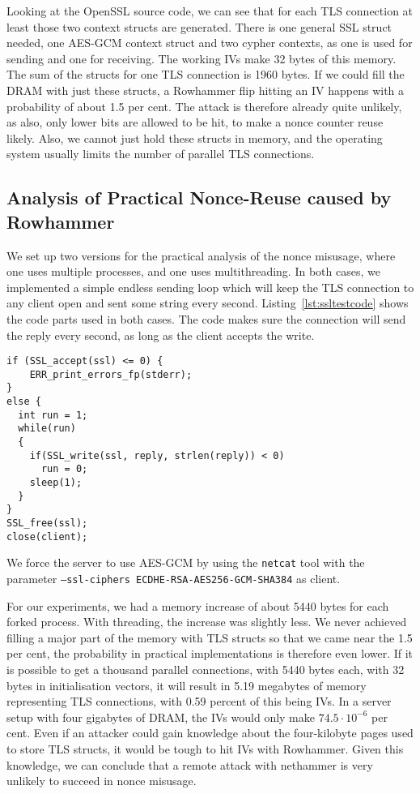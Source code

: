 Looking at the OpenSSL source code, we can see that for each TLS connection at
least those two context structs are generated. There is one general SSL struct
needed, one AES-GCM context struct and two cypher contexts, as one is used for
sending and one for receiving. The working IVs make 32 bytes of this memory. The
sum of the structs for one TLS connection is 1960 bytes. If we could fill the
DRAM with just these structs, a Rowhammer flip hitting an IV happens with a
probability of about 1.5 per cent. The attack is therefore already quite
unlikely, as also, only lower bits are allowed to be hit, to make a nonce
counter reuse likely. Also, we cannot just hold these structs in memory, and the
operating system usually limits the number of parallel TLS connections.

\subsection{Analysis of Practical Nonce-Reuse caused by Rowhammer}

We set up two versions for the practical analysis of the nonce misusage, where
one uses multiple processes, and one uses multithreading. In both cases, we
implemented a simple endless sending loop which will keep the TLS connection to
any client open and sent some string every second. Listing~\ref{lst:ssltestcode}
shows the code parts used in both cases. The code makes sure the connection will
send the reply every second, as long as the client accepts the write.

\begin{minipage}{\linewidth}
\begin{lstlisting}[style=CStyle,
                   caption={},
                   label={lst:ssltestcode}]
if (SSL_accept(ssl) <= 0) {
    ERR_print_errors_fp(stderr);
}
else {
  int run = 1;
  while(run)
  {
    if(SSL_write(ssl, reply, strlen(reply)) < 0)
      run = 0;
    sleep(1);
  }
}
SSL_free(ssl);
close(client);
\end{lstlisting}
\end{minipage}

We force the server to use AES-GCM by using the \texttt{netcat} tool with the
parameter \texttt{--ssl-ciphers ECDHE-RSA-AES256-GCM-SHA384} as client.

For our experiments, we had a memory increase of about 5440 bytes for each
forked process. With threading, the increase was slightly less. We never
achieved filling a major part of the memory with TLS structs so that we came
near the 1.5 per cent, the probability in practical implementations is therefore
even lower. If it is possible to get a thousand parallel connections, with 5440
bytes each, with 32 bytes in initialisation vectors, it will result in 5.19
megabytes of memory representing TLS connections, with 0.59 percent of this
being IVs. In a server setup with four gigabytes of DRAM, the IVs would only
make $74.5\cdot10^{-6}$ per cent. Even if an attacker could gain knowledge
about the four-kilobyte pages used to store TLS structs, it would be tough to
hit IVs with Rowhammer. Given this knowledge, we can conclude that a remote
attack with nethammer is very unlikely to succeed in nonce misusage.

